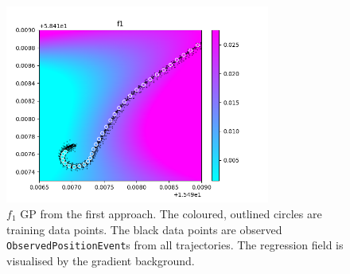 \begin{figure}[t]   
    \centering 
    \includegraphics[width=0.775\textwidth]{figures/f1_gp/f1_gp_small_all_data}
    \caption[$f_1$ GP from the first approach]%
    {{\small $f_1$ GP from the first approach.
    The coloured, outlined circles are training data points.
    The black data points are observed \texttt{ObservedPositionEvent}s from all trajectories.
    The regression field is visualised by the gradient background.}}    
    \label{fig:f1-gp-bad}
\end{figure}

